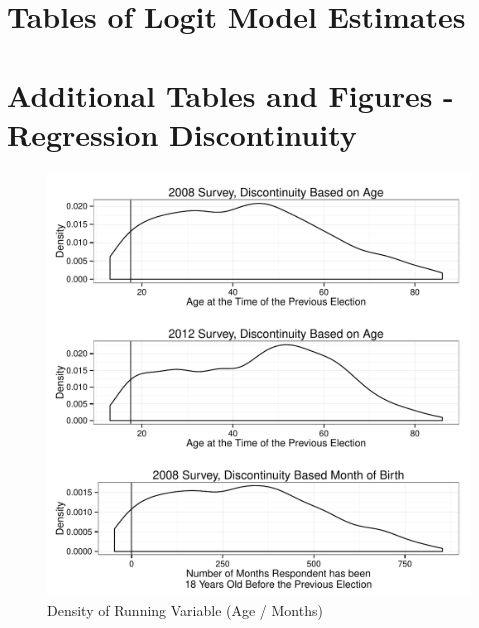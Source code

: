 \documentclass[12pt]{article}
\begin{document}
\clearpage
\section{Tables of Logit Model Estimates}
\renewcommand\thefigure{\thesection.\arabic{figure}}
\renewcommand\thetable{\thesection.\arabic{table}}
\setcounter{figure}{0}
\setcounter{table}{0}









\clearpage
\section{Additional Tables and Figures - Regression Discontinuity}
\renewcommand\thefigure{\thesection.\arabic{figure}}
\renewcommand\thetable{\thesection.\arabic{table}}
\setcounter{figure}{0}
\setcounter{table}{0}

\begin{figure}[ht]\centering
\includegraphics[scale=.5]{../calc/fig/rd2_density.pdf}
\caption{Density of Running Variable (Age / Months)}\label{fig:rd2_density}
\end{figure}
\end{document}
